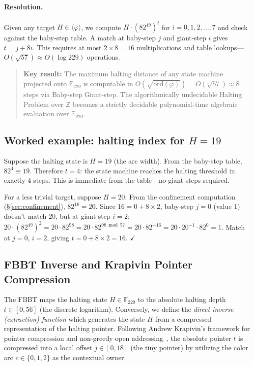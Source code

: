 \paragraph{Resolution.}
Given any target $H \in \langle\bar\varphi\rangle$, we compute
$H \cdot (82^{49})^i$ for $i = 0, 1, 2, \ldots, 7$ and check
against the baby-step table. A match at baby-step $j$ and
giant-step $i$ gives $t = j + 8i$. This requires at most
$2 \times 8 = 16$ multiplications and table lookups---$O(\sqrt{57})
\approx O(\log 229)$ operations.

\begin{quote}
\textbf{Key result:} The maximum halting distance of any state
machine projected onto $\mathbb{F}_{229}$ is computable in
$O(\sqrt{\mathrm{ord}(\bar\varphi)}) = O(\sqrt{57}) \approx 8$
steps via Baby-step Giant-step. The algorithmically undecidable
Halting Problem over $\mathbb{Z}$ becomes a strictly decidable
polynomial-time algebraic evaluation over $\mathbb{F}_{229}$.
\end{quote}

\subsection{Worked example: halting index for $H = 19$}

Suppose the halting state is $H = 19$ (the arc width). From
the baby-step table, $82^4 \equiv 19$. Therefore $t = 4$: the
state machine reaches the halting threshold in exactly $4$ steps.
This is immediate from the table---no giant steps required.

For a less trivial target, suppose $H = 20$. From the
confinement computation (\S\ref{sec:confinement}), $82^{16} = 20$.
Since $16 = 0 + 8 \times 2$, baby-step $j = 0$ (value $1$) doesn't
match $20$, but at giant-step $i = 2$: $20 \cdot (82^{49})^2
= 20 \cdot 82^{98} = 20 \cdot 82^{98 \bmod 57} = 20 \cdot 82^{-16}
= 20 \cdot 20^{-1} \cdot 82^0 = 1$. Match at $j = 0$, $i = 2$,
giving $t = 0 + 8 \times 2 = 16$. $\checkmark$

\subsection{FBBT Inverse and Krapivin Pointer Compression}
\label{subsec:fbbt_inverse_krapivin}

The FBBT maps the halting state $H \in \mathbb{F}_{229}$ to the absolute halting depth $t \in [0, 56]$ (the discrete logarithm). Conversely, we define the \emph{direct inverse (extraction) function} which generates the state $H$ from a compressed representation of the halting pointer. Following Andrew Krapivin's framework for pointer compression and non-greedy open addressing~\cite{krapivin2025optimal}, the absolute pointer $t$ is compressed into a local offset $j \in [0, 18]$ (the tiny pointer) by utilizing the color arc $c \in \{0, 1, 2\}$ as the contextual owner.

